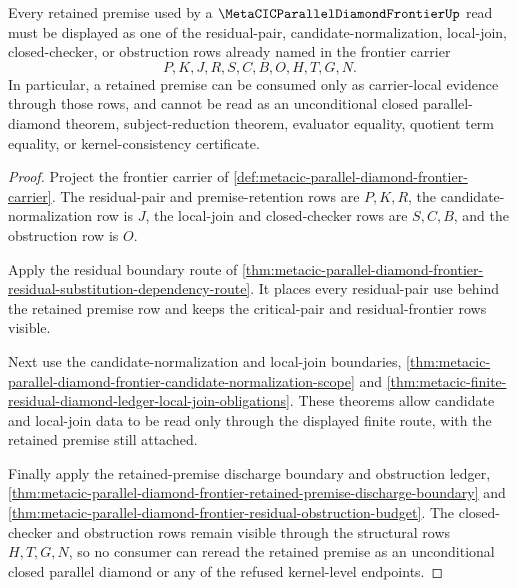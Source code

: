 \begin{theorem}
\label{thm:metacic-parallel-diamond-frontier-retained-premise-scope}
Every retained premise used by a $\MetaCICParallelDiamondFrontierUp$ read must be displayed as one of the residual-pair, candidate-normalization, local-join, closed-checker, or obstruction rows already named in the frontier carrier
$$
P,K,J,R,S,C,B,O,H,T,G,N .
$$
In particular, a retained premise can be consumed only as carrier-local evidence through those rows, and cannot be read as an unconditional closed parallel-diamond theorem, subject-reduction theorem, evaluator equality, quotient term equality, or kernel-consistency certificate.
\end{theorem}
\begin{proof}
Project the frontier carrier of \autoref{def:metacic-parallel-diamond-frontier-carrier}. The residual-pair and premise-retention rows are $P,K,R$, the candidate-normalization row is $J$, the local-join and closed-checker rows are $S,C,B$, and the obstruction row is $O$.

Apply the residual boundary route of \autoref{thm:metacic-parallel-diamond-frontier-residual-substitution-dependency-route}. It places every residual-pair use behind the retained premise row and keeps the critical-pair and residual-frontier rows visible.

Next use the candidate-normalization and local-join boundaries, \autoref{thm:metacic-parallel-diamond-frontier-candidate-normalization-scope} and \autoref{thm:metacic-finite-residual-diamond-ledger-local-join-obligations}. These theorems allow candidate and local-join data to be read only through the displayed finite route, with the retained premise still attached.

Finally apply the retained-premise discharge boundary and obstruction ledger, \autoref{thm:metacic-parallel-diamond-frontier-retained-premise-discharge-boundary} and \autoref{thm:metacic-parallel-diamond-frontier-residual-obstruction-budget}. The closed-checker and obstruction rows remain visible through the structural rows $H,T,G,N$, so no consumer can reread the retained premise as an unconditional closed parallel diamond or any of the refused kernel-level endpoints.
\end{proof}

